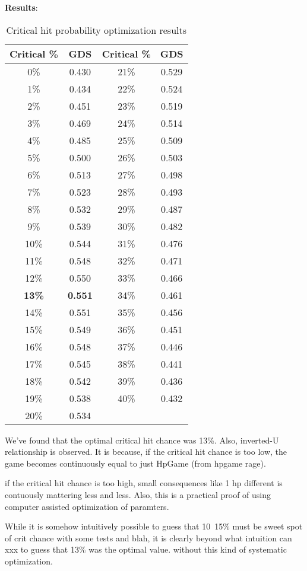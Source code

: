 \documentclass{article}
\begin{document}
\textbf{Results}:
\begin{table}[H]
\centering
\begin{tabular}{|c|c||c|c|}
\hline
Critical \% & GDS & Critical \% & GDS \\
\hline
0\% & 0.430 & 21\% & 0.529 \\
1\% & 0.434 & 22\% & 0.524 \\
2\% & 0.451 & 23\% & 0.519 \\
3\% & 0.469 & 24\% & 0.514 \\
4\% & 0.485 & 25\% & 0.509 \\
5\% & 0.500 & 26\% & 0.503 \\
6\% & 0.513 & 27\% & 0.498 \\
7\% & 0.523 & 28\% & 0.493 \\
8\% & 0.532 & 29\% & 0.487 \\
9\% & 0.539 & 30\% & 0.482 \\
10\% & 0.544 & 31\% & 0.476 \\
11\% & 0.548 & 32\% & 0.471 \\
12\% & 0.550 & 33\% & 0.466 \\
\textbf{13\%} & \textbf{0.551} & 34\% & 0.461 \\
14\% & 0.551 & 35\% & 0.456 \\
15\% & 0.549 & 36\% & 0.451 \\
16\% & 0.548 & 37\% & 0.446 \\
17\% & 0.545 & 38\% & 0.441 \\
18\% & 0.542 & 39\% & 0.436 \\
19\% & 0.538 & 40\% & 0.432 \\
20\% & 0.534 &  &  \\
\hline
\end{tabular}
\caption{Critical hit probability optimization results}
\end{table}

We've found that the optimal critical hit chance was 13\%. Also, inverted-U relationship is observed.
It is because, if the critical hit chance is too low, the game becomes continuously equal to just HpGame (from hpgame rage).

if the critical hit chance is too high, small consequences like 1 hp different is contuously mattering less and less.
Also, this is a practical proof of using computer assisted optimization of paramters.

While it is somehow intuitively possible to guess that 10~15\% must be sweet spot of crit chance with some tests and blah,
it is clearly beyond what intuition can xxx to guess that 13\% was the optimal value. without this kind of systematic optimization.
\end{document}
